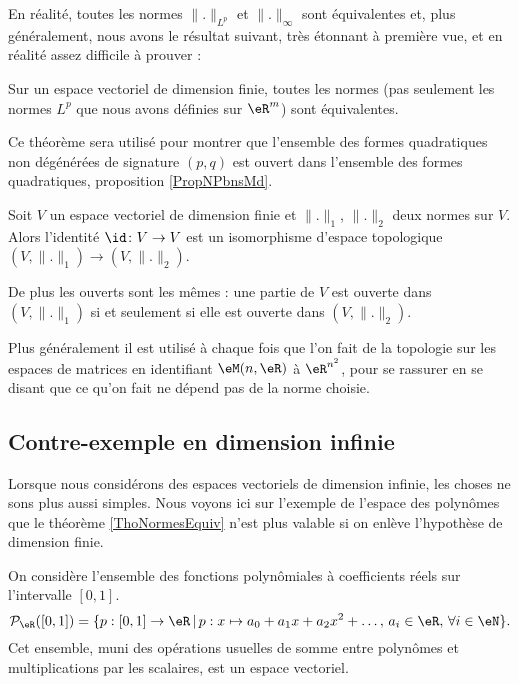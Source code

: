 En réalité, toutes les normes \( \| . \|_{L^p}\) et \( \| . \|_{\infty}\) sont équivalentes et, plus généralement, nous avons le résultat suivant, très étonnant à première vue, et en réalité assez difficile à prouver :
\begin{theorem}		\label{ThoNormesEquiv}
	Sur un espace vectoriel de dimension finie, toutes les normes (pas seulement les normes $L^p$ que nous avons définies sur $\eR^m$) sont équivalentes.
\end{theorem}
Ce théorème sera utilisé pour montrer que l'ensemble des formes quadratiques non dégénérées de signature \( (p,q)\) est ouvert dans l'ensemble des formes quadratiques, proposition \ref{PropNPbnsMd}.

\begin{corollary}
    Soit \( V\) un espace vectoriel de dimension finie et \( \| . \|_1\), \( \| . \|_2\) deux normes sur \( V\). Alors l'identité \( \id\colon V\to V\) est un isomorphisme d'espace topologique \( (V,\| . \|_1)\to (V,\| . \|_2)\).

    De plus les ouverts sont les mêmes : une partie de \( V\) est ouverte dans \( (V,\| . \|_1)\) si et seulement si elle est ouverte dans \( (V,\| . \|_2)\).
\end{corollary}

Plus généralement il est utilisé à chaque fois que l'on fait de la topologie sur les espaces de matrices en identifiant \( \eM(n,\eR)\) à \( \eR^{n^2}\), pour se rassurer en se disant que ce qu'on fait ne dépend pas de la norme choisie.

\subsection{Contre-exemple en dimension infinie}
\label{SubSecPOlynomesCE}

Lorsque nous considérons des espaces vectoriels de dimension infinie, les choses ne sons plus aussi simples. Nous voyons ici sur l'exemple de l'espace des polynômes que le théorème \ref{ThoNormesEquiv} n'est plus valable si on enlève l'hypothèse de dimension finie.

On considère l'ensemble des fonctions polynômiales à coefficients réels sur  l'intervalle $[0,1]$.
\begin{equation}
\mathcal{P}_\eR([0,1])=\{p:[0,1]\to \eR\,|\, p : x\mapsto a_0+a_1 x +a_2 x^2 + \ldots, \, a_i\in\eR,\,\forall i\in \eN\}.
\end{equation}
Cet ensemble, muni des opérations usuelles de somme entre polynômes et multiplications par les scalaires, est un espace vectoriel.  

